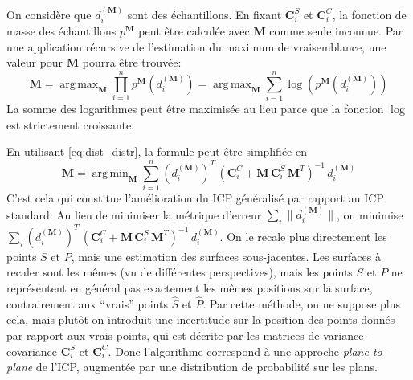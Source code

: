 \documentclass[a4paper,10pt]{scrreprt}
\DeclareMathOperator*{\argmax}{arg\,max}
\DeclareMathOperator*{\argmin}{arg\,min}
\begin{document}
On considère que $d^{(\mathbf{M})}_i$ sont des échantillons. En fixant $\mathbf{C}^S_i$ et $\mathbf{C}^C_i$, la fonction de masse des échantillons $p^{\mathbf{M}}$ peut être calculée avec $\mathbf{M}$ comme seule inconnue. Par une application récursive de l'estimation du maximum de vraisemblance, une valeur pour $\mathbf{M}$ pourra être trouvée:
\begin{equation*}
	\mathbf{M}
	= \argmax_{\mathbf{M}} \prod_{i=1}^{n} p^{\mathbf{M}}(d^{(\mathbf{M})}_i)
	= \argmax_{\mathbf{M}} \sum_{i=1}^{n} \log(p^{\mathbf{M}}(d^{(\mathbf{M})}_i))
\end{equation*}
La somme des logarithmes peut être maximisée au lieu parce que la fonction $\log$ est strictement croissante.

En utilisant \ref{eq:dist_distr}, la formule peut être simplifiée en
\begin{equation*}
	\mathbf{M} = \argmin_{\mathbf{M}} \sum_{i=1}^{n}
	(d^{(\mathbf{M})}_i)^T \, (\mathbf{C}^C_i + \mathbf{M}\,\mathbf{C}^S_i\,\mathbf{M}^T)^{-1} \, d^{(\mathbf{M})}_i
\end{equation*}
C'est cela qui constitue l'amélioration du ICP généralisé par rapport au ICP standard: Au lieu de minimiser la métrique d'erreur $\sum_i \| d^{(\mathbf{M})}_i \|$, on minimise $\sum_i (d^{(\mathbf{M})}_i)^T \, (\mathbf{C}^C_i + \mathbf{M}\,\mathbf{C}^S_i\,\mathbf{M}^T)^{-1} \, d^{(\mathbf{M})}_i$. On le recale plus directement les points $S$ et $P$, mais une estimation des surfaces sous-jacentes. Les surfaces à recaler sont les mêmes (vu de différentes perspectives), mais les points $S$ et $P$ ne représentent en général pas exactement les mêmes positions sur la surface, contrairement aux  ``vrais'' points $\hat{S}$ et $\hat{P}$. Par cette méthode, on ne suppose plus cela, mais plutôt on introduit une incertitude sur la position des points donnés par rapport aux vrais points, qui est décrite par les matrices de variance-covariance $\mathbf{C}^S_i$ et $\mathbf{C}^C_i$. Donc l'algorithme correspond à une approche \emph{plane-to-plane} de l'ICP, augmentée par une distribution de probabilité sur les plans.
\end{document}
